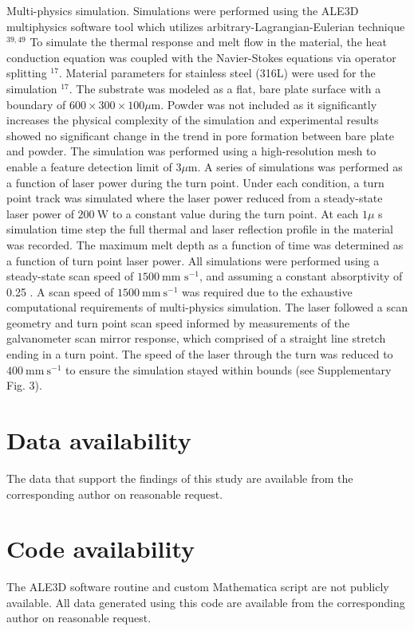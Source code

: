 \documentclass[10pt]{article}
\begin{document}
Multi-physics simulation. Simulations were performed using the ALE3D multiphysics software tool which utilizes arbitrary-Lagrangian-Eulerian technique ${ }^{39,49}$ To simulate the thermal response and melt flow in the material, the heat conduction equation was coupled with the Navier-Stokes equations via operator splitting ${ }^{17}$. Material parameters for stainless steel (316L) were used for the simulation ${ }^{17}$. The substrate was modeled as a flat, bare plate surface with a boundary of $600 \times 300 \times 100 \mu \mathrm{m}$. Powder was not included as it significantly increases the physical complexity of the simulation and experimental results showed no significant change in the trend in pore formation between bare plate and powder. The simulation was performed using a high-resolution mesh to enable a feature detection limit of $3 \mu \mathrm{m}$. A series of simulations was performed as a function of laser power during the turn point. Under each condition, a turn point track was simulated where the laser power reduced from a steady-state laser power of $200 \mathrm{~W}$ to a constant value during the turn point. At each $1 \mu$ s simulation time step the full thermal and laser reflection profile in the material was recorded. The maximum melt depth as a function of time was determined as a function of turn point laser power. All simulations were performed using a steady-state scan speed of $1500 \mathrm{~mm}$ $\mathrm{s}^{-1}$, and assuming a constant absorptivity of 0.25 . A scan speed of $1500 \mathrm{~mm} \mathrm{~s}^{-1}$ was required due to the exhaustive computational requirements of multi-physics simulation. The laser followed a scan geometry and turn point scan speed informed by measurements of the galvanometer scan mirror response, which comprised of a straight line stretch ending in a turn point. The speed of the laser through the turn was reduced to $400 \mathrm{~mm} \mathrm{~s}^{-1}$ to ensure the simulation stayed within bounds (see Supplementary Fig. 3).

\section*{Data availability}
The data that support the findings of this study are available from the corresponding author on reasonable request.

\section*{Code availability}
The ALE3D software routine and custom Mathematica script are not publicly available. All data generated using this code are available from the corresponding author on reasonable request.
\end{document}
